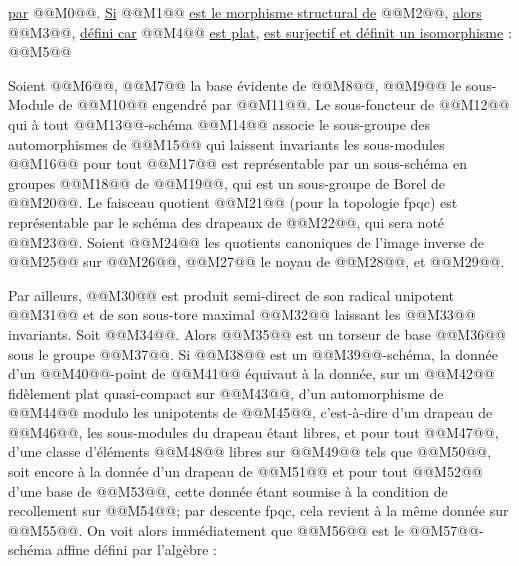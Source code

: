 
\uline{par} @@M0@@. \uline{Si} @@M1@@ \uline{est le morphisme structural de} @@M2@@, \uline{alors} @@M3@@, \uline{défini car} @@M4@@ \uline{est plat}, \uline{est surjectif et définit un isomorphisme} :
@@M5@@

Soient @@M6@@, @@M7@@ la base évidente de @@M8@@, @@M9@@ le sous-Module de @@M10@@ engendré par @@M11@@. Le sous-foncteur de @@M12@@ qui à tout @@M13@@-schéma @@M14@@ associe le sous-groupe des automorphismes de @@M15@@ qui laissent invariants les sous-modules @@M16@@ pour tout @@M17@@ est représentable par un sous-schéma en groupes @@M18@@ de @@M19@@, qui est un sous-groupe de Borel de @@M20@@. Le faisceau quotient @@M21@@ (pour la topologie fpqc) est représentable par le schéma des drapeaux de @@M22@@, qui sera noté @@M23@@. Soient @@M24@@ les quotients canoniques de l'image inverse de @@M25@@ sur @@M26@@, @@M27@@ le noyau de @@M28@@, et @@M29@@.

Par ailleurs, @@M30@@ est produit semi-direct de son radical unipotent @@M31@@ et de son sous-tore maximal @@M32@@ laissant les @@M33@@ invariants. Soit @@M34@@. Alors @@M35@@ est un torseur de base @@M36@@ sous le groupe @@M37@@. Si @@M38@@ est un @@M39@@-schéma, la donnée d'un @@M40@@-point de @@M41@@ équivaut à la donnée, sur un @@M42@@ fidèlement plat quasi-compact sur @@M43@@, d'un automorphisme de @@M44@@ modulo les unipotents de @@M45@@, c'est-à-dire d'un drapeau de @@M46@@, les sous-modules du drapeau étant libres, et pour tout @@M47@@, d'une classe d'éléments @@M48@@ libres sur @@M49@@ tels que @@M50@@, soit encore à la donnée d'un drapeau de @@M51@@ et pour tout @@M52@@ d'une base de @@M53@@, cette donnée étant soumise à la condition de recollement sur @@M54@@; par descente fpqc, cela revient à la même donnée sur @@M55@@. On voit alors immédiatement que @@M56@@ est le @@M57@@-schéma affine défini par l'algèbre :
